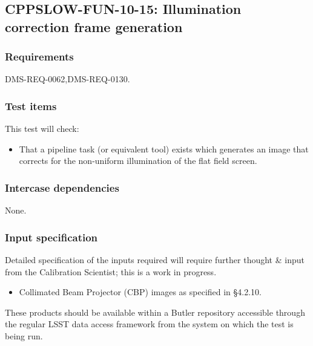 \subsection{CPPSLOW-FUN-10-15: Illumination correction frame generation}
\label{cppslow-fun-10-15}

\subsubsection{Requirements}

DMS-REQ-0062,DMS-REQ-0130.

\subsubsection{Test items}

This test will check:

\begin{itemize}

  \item{That a pipeline task (or equivalent tool) exists which generates an
  image that corrects for the non-uniform illumination of the flat field
  screen.}

\end{itemize}

\subsubsection{Intercase dependencies}

None.

\subsubsection{Input specification}

\begin{note}
Detailed specification of the inputs required will require further thought \&
input from the Calibration Scientist; this is a work in progress.
\end{note}

\begin{itemize}

  \item{Collimated Beam Projector (CBP) images as specified in 
  \S4.2.10.}

\end{itemize}

These products should be available within a Butler repository accessible
through the regular LSST data access framework from the system on which the test
is being run.

